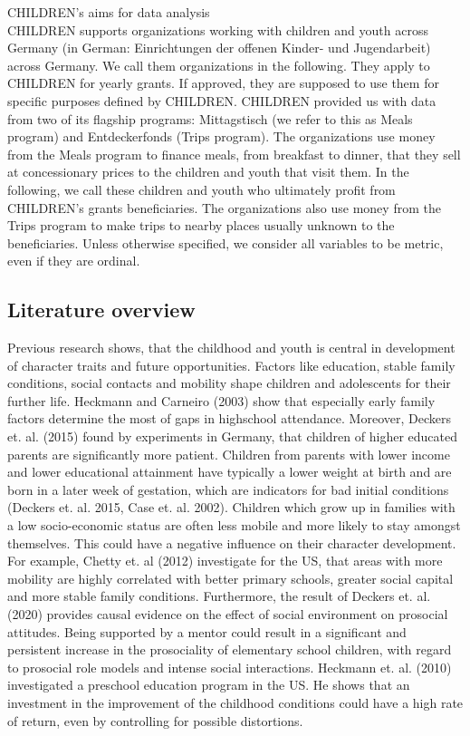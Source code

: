 \documentclass[12pt, a4paper, titlepage]{article}\usepackage[]{graphicx}\usepackage[]{color}
\begin{document}
CHILDREN's aims for data analysis\\ 
CHILDREN supports organizations working with children and youth across Germany (in German: Einrichtungen der offenen Kinder- und Jugendarbeit) across Germany. We call them organizations in the following. They apply to CHILDREN for yearly grants. If approved, they are supposed to use them for specific purposes defined by CHILDREN. CHILDREN provided us with data from two of its flagship programs: Mittagstisch (we refer to this as Meals program) and Entdeckerfonds (Trips program). The organizations use money from the Meals program to finance meals, from breakfast to dinner, that they sell at concessionary prices to the children and youth that visit them. In the following, we call these children and youth who ultimately profit from CHILDREN's grants beneficiaries. The organizations also use money from the Trips program to make trips to nearby places usually unknown to the beneficiaries.  
Unless otherwise specified, we consider all variables to be metric, even if they are ordinal. 

\subsection{Literature overview}

Previous research shows, that the childhood and youth is central in development of character traits and future opportunities. Factors like education, stable family conditions, social contacts and mobility shape children and adolescents for their further life. Heckmann and Carneiro (2003) show that especially early family factors determine the most of gaps in highschool attendance. Moreover, Deckers et. al. (2015) found by experiments in Germany, that children of higher educated parents are significantly more patient. Children from parents with lower income and lower educational attainment have typically a lower weight at birth and are born in a later week of gestation, which are indicators for bad initial conditions (Deckers et. al. 2015, Case et. al. 2002). Children which grow up in families with a low socio-economic status are often less mobile and more likely to stay amongst themselves. This could have a negative influence on their character development. For example, Chetty et. al (2012) investigate for the US, that areas with more mobility are highly correlated with better primary schools, greater social capital and more stable family conditions. Furthermore, the result of Deckers et. al. (2020) provides causal evidence on the effect of social environment on prosocial attitudes. Being supported by a mentor could result in a significant and persistent increase in the prosociality of elementary school children, with regard to prosocial role models and intense social interactions. Heckmann et. al. (2010) investigated a preschool education program in the US. He shows that an investment in the improvement of the childhood conditions could have a high rate of return, even by controlling for possible distortions.   
\end{document}
